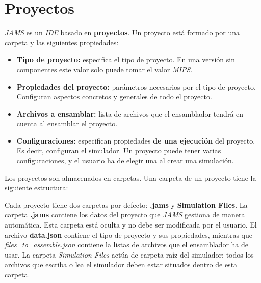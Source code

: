 \section{Proyectos}\label{sec:interfaz-grafica}

\textit{JAMS} es un \textit{IDE} basado en \textbf{proyectos}.
Un proyecto está formado por una carpeta y las siguientes propiedades:
\begin{itemize}
    \item \textbf{Tipo de proyecto:} especifica el tipo de proyecto.
    En una versión sin componentes este valor solo puede tomar el valor \textit{MIPS}.
    \item \textbf{Propiedades del proyecto:} parámetros necesarios por el tipo de proyecto.
    Configuran aspectos concretos y generales de todo el proyecto.
    \item \textbf{Archivos a ensamblar:} lista de archivos que el ensamblador tendrá en cuenta
    al ensamblar el proyecto.
    \item \textbf{Configuraciones:} especifican propiedades \textbf{de una ejecución} del proyecto.
    Es decir, configuran el simulador.
    Un proyecto puede tener varias configuraciones, y el usuario ha de elegir una al crear una
    simulación.
\end{itemize}

Los proyectos son almacenados en carpetas.
Una carpeta de un proyecto tiene la siguiente estructura:

\begin{center}
\end{center}

Cada proyecto tiene dos carpetas por defecto: \textbf{.jams} y
\textbf{Simulation Files}.
La carpeta \textbf{.jams} contiene los datos del proyecto que \textit{JAMS}
gestiona de manera automática.
Esta carpeta está oculta y no debe ser modificada por el usuario.
El archivo \textbf{data.json} contiene el tipo de proyecto y sus propiedades,
mientras que \textit{files\_to\_assemble.json} contiene la listas de archivos
que el ensamblador ha de usar.
La carpeta \textit{Simulation Files} actúa de carpeta raíz del simulador:
todos los archivos que escriba o lea el simulador deben estar situados dentro
de esta carpeta.
